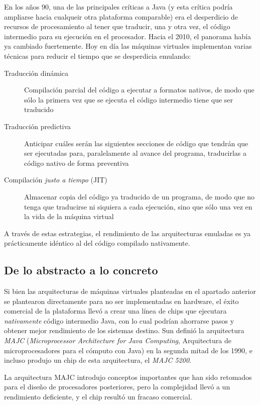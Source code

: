 \documentclass[11pt,fleqn]{book} %
\begin{document}
En los años 90, una de las principales críticas a Java (y esta crítica
podría ampliarse hacia cualqueir otra plataforma comparable) era el
desperdicio de recursos de procesamiento al tener que traducir, una y
otra vez, el código intermedio para su ejecución en el
procesador. Hacia el 2010, el panorama había ya cambiado
fuertemente. Hoy en día las máquinas virtuales implementan varias
técnicas para reducir el tiempo que se desperdicia emulando:

\begin{description}
\item[Traducción dinámica] Compilación parcial del código a ejecutar a
     formatos nativos, de modo que sólo la primera vez que se ejecuta
     el código intermedio tiene que ser traducido
\item[Traducción predictiva] Anticipar cuáles serán las siguientes
     secciones de código que tendrán que ser ejecutadas para,
     paralelamente al avance del programa,  traducirlas a código
     nativo de forma preventiva
\item[Compilación \emph{justo a tiempo} (JIT)] Almacenar copia del código ya
     traducido de un programa, de modo que no tenga que traducirse ni
     siquiera a cada ejecución, sino que sólo una vez en la vida de
     la máquina virtual
\end{description}

A través de estas estrategias, el rendimiento de las
arquitecturas emuladas es ya prácticamente idéntico al del código
compilado nativamente.
\subsection{De lo abstracto a lo concreto}
\label{sec-9-2-2}


Si bien las arquitecturas de máquinas virtuales planteadas en el
apartado anterior se plantearon directamente para no ser
implementadas en hardware, el éxito comercial de la plataforma llevó
a crear una línea de chips que ejecutara \emph{nativamente} código
intermedio Java, con lo cual podrían ahorrarse pasos y obtener mejor
rendimiento de los sistemas destino. Sun definió la arquitectura
\emph{MAJC} (\emph{Microprocessor Architecture for Java Computing}, Arquitectura
de microprocesadores para el cómputo con Java) en la segunda mitad de
los 1990, e incluso produjo un chip de esta arquitectura, el
\emph{MAJC 5200}.

La arquitectura MAJC introdujo conceptos importantes que han sido
retomados para el diseño de procesadores posteriores, pero la
complejidad llevó a un rendimiento deficiente, y el chip resultó un
fracaso comercial.
\end{document}
